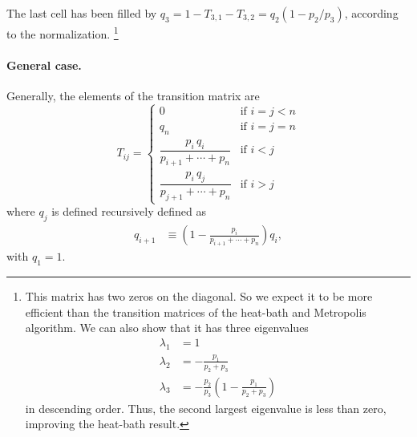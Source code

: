 \documentclass[12pt]{article}
\begin{document}
The last cell has been filled by $q_3 = 1 - T_{3,1} - T_{3,2} = q_2 (1 - p_2/p_3)$,
according to the normalization.
%
\footnote{
This matrix has two zeros on the diagonal.
So we expect it to be more efficient than
the transition matrices of
the heat-bath and Metropolis algorithm.
%
We can also show that it has three eigenvalues
\begin{equation}
\begin{aligned}
  \lambda_1 &= 1 \\
  \lambda_2 &= -\frac{p_1}{p_2+p_3} \\
  \lambda_3 &= -\frac{p_2}{p_3}\left( 1 - \frac{p_1}{p_2+p_3} \right)
\end{aligned}
\label{eq:lambda_dbimproved}
\end{equation}
in descending order.
Thus, the second largest eigenvalue is less than zero,
improving the heat-bath result.
}

\paragraph{General case.}

Generally, the elements of the transition matrix are
$$
T_{ij} =
\begin{cases}
  0 & \mbox{if $i = j < n$} \\
  q_n & \mbox{if $i = j = n$} \\
  \dfrac{p_i \, q_i } { p_{i+1} + \cdots + p_n} & \mbox{if $i < j$} \\
  \dfrac{p_i \, q_j}{p_{j+1} + \cdots + p_n} & \mbox{if $i > j$}
\end{cases}
$$
where $q_j$ is defined recursively defined as
$$
\begin{aligned}
  q_{i+1} &\equiv \left(1 - \frac{p_i}{p_{i+1} + \cdots + p_n} \right) q_i,
\end{aligned}
$$
with $q_1 = 1$.
\end{document}
